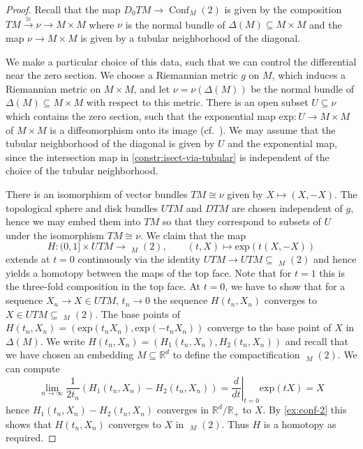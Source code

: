 \documentclass{scrartcl}
\theoremstyle{plain}
\theoremstyle{definition}
\newcommand{\R}{\mathbb R}
\renewcommand{\subset}{\subseteq}
\newcommand{\iso}{\cong}
\let\xto\xrightarrow
\DeclareMathOperator{\Conf}{Conf}
\DeclareMathOperator{\cConf}{\overline{Conf}}
\begin{document}
\begin{proof}
    Recall that the map $D_0TM \to \Conf_M(2)$ is given by the composition $TM\xto{\iso} \nu\to M\times M$ where $\nu$ is the normal bundle of $\Delta(M)\subset M\times M$ and the map $\nu\to M\times M$ is given by a tubular neighborhood of the diagonal. 

We make a particular choice of this data, such that we can control the differential near the zero section. We choose a Riemannian metric $g$ on $M$, which induces a Riemannian metric on $M\times M$, and let $\nu=\nu(\Delta(M))$ be the normal bundle of $\Delta(M)\subset M\times M$ with respect to this metric. There is an open subset $U\subset \nu$ which contains the zero section, such that the exponential map $\mathrm{exp}\colon U\to M\times M$ of $M\times M$ is a diffeomorphism onto its image (cf.\ \cite[Ex. 8-5]{lee2006riemannian}). We may assume that the tubular neighborhood of the diagonal is given by $U$ and the exponential map, since the intersection map in \cref{constr:isect-via-tubular} is independent of the choice of the tubular neighborhood.
   
There is an isomorphism of vector bundles $TM\iso \nu$ given by $X\mapsto (X, -X)$. The topological sphere and disk bundles $UTM$ and $DTM$ are chosen independent of $g$, hence we may embed them into $TM$ so that they correspond to subsets of $U$ under the isomorphism $TM\iso \nu$. We claim that the map 
$$H\colon (0, 1]\times UTM\to \cConf_M(2), \qquad (t, X)\mapsto \mathrm{exp}(t(X, -X))$$ 
extends at $t=0$ continuously via the identity $UTM\to UTM\subset \cConf_M(2)$ and hence yields a homotopy between the maps of the top face. Note that for $t=1$ this is the three-fold composition in the top face. At $t=0$, we have to show that for a sequence $X_n\to X\in UTM$, $t_n\to 0$ the sequence $H(t_n, X_n)$ converges to $X\in UTM\subset \cConf_M(2)$. The base points of $H(t_n, X_n) = (\mathrm{exp}(t_nX_n), \mathrm{exp}(-t_nX_n))$ converge to the base point of $X$ in $\Delta(M)$.    We write $H(t_n, X_n) = (H_1(t_n, X_n), H_2(t_n, X_n))$ and recall that we have chosen an embedding $M\subset \R^d$ to define the compactification $\cConf_M(2)$. We can compute $$\lim_{n\to\infty} \frac 1 {2t_n} (H_1(t_n, X_n) - H_2(t_n, X_n)) = \left.\frac{d}{dt}\right|_{t=0} \mathrm{exp}(tX) = X$$ hence $H_1(t_n, X_n) - H_2(t_n, X_n)$ converges in $\R^d/\R_+$ to $X$. By \cref{ex:conf-2} this shows that $H(t_n, X_n)$ converges to $X$ in $\cConf_M(2)$. Thus $H$ is a homotopy as required.
\end{proof}
\end{document}
